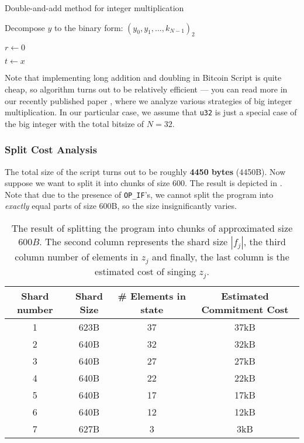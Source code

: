\documentclass{iacrtrans}
\begin{document}
\begin{algorithm}
  \caption{Double-and-add method for integer multiplication}\label{alg:double_and_add}
  
  Decompose $y$ to the binary form: $(y_0,y_1,\dots,k_{N-1})_2$
  
  $r \gets 0$
  
  $t \gets x$
  
  
  
\end{algorithm}

Note that implementing long addition and doubling in Bitcoin Script is quite cheap, so algorithm turns out to be relatively efficient --- you can read more in our recently published paper \cite{w-width-mul}, where we analyze various strategies of big integer multiplication. In our particular case, we assume that \texttt{u32} is just a special case of the big integer with the total bitsize of $N=32$. 

\subsubsection{Split Cost Analysis}

The total size of the script turns out to be roughly \textbf{4450 bytes} (4450B). Now suppose we want to split it into chunks of size $600$. The result is depicted in . Note that due to the presence of \texttt{OP\_IF}'s, we cannot split the program into \textit{exactly} equal parts of size 600B, so the size insignificantly varies.

\begin{table}[H]
  \centering
  \begin{tabular}{cccc}
    \toprule
    \textbf{Shard number} & \textbf{Shard Size} & \textbf{\# Elements in state} & \textbf{Estimated Commitment Cost} \\
    \midrule
    1 & 623B & 37 & 37kB \\
    2 & 640B & 32 & 32kB \\
    3 & 640B & 27 & 27kB \\
    4 & 640B & 22 & 22kB \\
    5 & 640B & 17 & 17kB \\
    6 & 640B & 12 & 12kB \\
    7 & 627B & 3  & 3kB \\ 
    \bottomrule
  \end{tabular}
  \caption{The result of splitting the program into chunks of approximated size $600B$. The second column represents the shard size $|f_j|$, the third column number of elements in $z_j$ and finally, the last column is the estimated cost of singing $z_j$.}
  \label{tab:u32_split}
\end{table}
\end{document}
